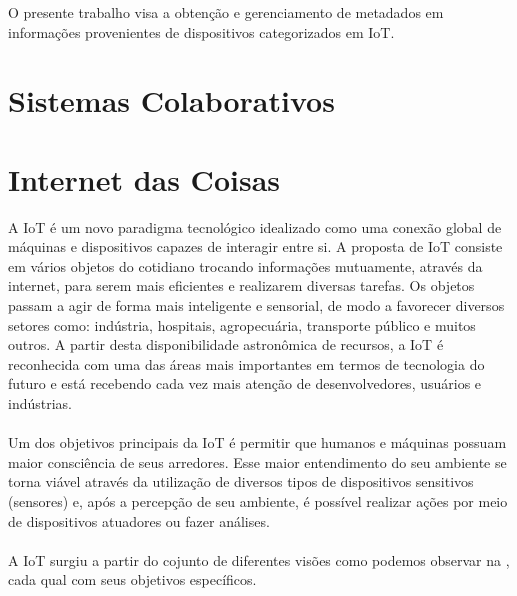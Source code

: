 O presente trabalho visa a obtenção e gerenciamento de metadados em informações provenientes de
dispositivos categorizados em \acrfull{IoT}. %

\section{Sistemas Colaborativos}


\section{Internet das Coisas}%
A \acrlong{IoT} é um novo paradigma tecnológico idealizado como uma conexão global
de máquinas e dispositivos capazes de interagir entre si. A proposta de \acrshort{IoT} consiste em vários objetos do cotidiano trocando informações
mutuamente, através da internet, para serem mais eficientes e realizarem diversas tarefas.
Os objetos passam a agir de forma mais inteligente e sensorial, de modo a favorecer diversos setores como:
indústria, hospitais, agropecuária, transporte público e muitos outros. A partir desta
disponibilidade astronômica de recursos, a \acrshort{IoT} é reconhecida com uma das áreas mais importantes
em termos de tecnologia do futuro e está recebendo cada vez mais atenção de desenvolvedores, usuários e indústrias.
\\\\Um dos objetivos principais da \acrlong{IoT} é permitir
que humanos e máquinas possuam maior consciência de seus arredores.
 Esse maior entendimento do seu ambiente se torna viável através da utilização
 de diversos tipos de dispositivos sensitivos (sensores) e, após a percepção
 de seu ambiente, é possível realizar ações por meio de dispositivos atuadores ou fazer análises.\\\\
 A \acrlong{IoT} surgiu a partir do cojunto de diferentes visões como podemos observar na , cada qual com seus objetivos específicos.
